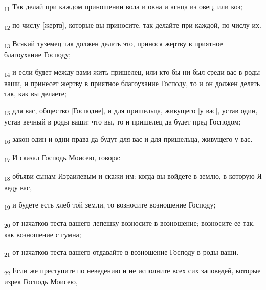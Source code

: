 \begin{tcolorbox}
\textsubscript{11} Так делай при каждом приношении вола и овна и агнца из овец, или коз;
\end{tcolorbox}
\begin{tcolorbox}
\textsubscript{12} по числу [жертв], которые вы приносите, так делайте при каждой, по числу их.
\end{tcolorbox}
\begin{tcolorbox}
\textsubscript{13} Всякий туземец так должен делать это, принося жертву в приятное благоухание Господу;
\end{tcolorbox}
\begin{tcolorbox}
\textsubscript{14} и если будет между вами жить пришелец, или кто бы ни был среди вас в роды ваши, и принесет жертву в приятное благоухание Господу, то и он должен делать так, как вы делаете;
\end{tcolorbox}
\begin{tcolorbox}
\textsubscript{15} для вас, общество [Господне], и для пришельца, живущего [у вас], устав один, устав вечный в роды ваши: что вы, то и пришелец да будет пред Господом;
\end{tcolorbox}
\begin{tcolorbox}
\textsubscript{16} закон один и одни права да будут для вас и для пришельца, живущего у вас.
\end{tcolorbox}
\begin{tcolorbox}
\textsubscript{17} И сказал Господь Моисею, говоря:
\end{tcolorbox}
\begin{tcolorbox}
\textsubscript{18} объяви сынам Израилевым и скажи им: когда вы войдете в землю, в которую Я веду вас,
\end{tcolorbox}
\begin{tcolorbox}
\textsubscript{19} и будете есть хлеб той земли, то возносите возношение Господу;
\end{tcolorbox}
\begin{tcolorbox}
\textsubscript{20} от начатков теста вашего лепешку возносите в возношение; возносите ее так, как возношение с гумна;
\end{tcolorbox}
\begin{tcolorbox}
\textsubscript{21} от начатков теста вашего отдавайте в возношение Господу в роды ваши.
\end{tcolorbox}
\begin{tcolorbox}
\textsubscript{22} Если же преступите по неведению и не исполните всех сих заповедей, которые изрек Господь Моисею,
\end{tcolorbox}
